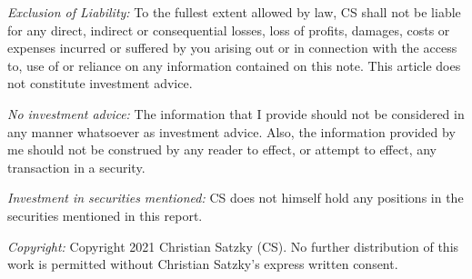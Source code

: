 \documentclass[
  12pt,
]{article}
\begin{document}
\emph{Exclusion of Liability:} To the fullest extent allowed by law, CS
shall not be liable for any direct, indirect or consequential losses,
loss of profits, damages, costs or expenses incurred or suffered by you
arising out or in connection with the access to, use of or reliance on
any information contained on this note. This article does not constitute
investment advice.

\emph{No investment advice:} The information that I provide should not
be considered in any manner whatsoever as investment advice. Also, the
information provided by me should not be construed by any reader to
effect, or attempt to effect, any transaction in a security.

\emph{Investment in securities mentioned:} CS does not himself hold any
positions in the securities mentioned in this report.

\emph{Copyright:} Copyright 2021 Christian Satzky (CS). No further
distribution of this work is permitted without Christian Satzky's
express written consent.
\end{document}
